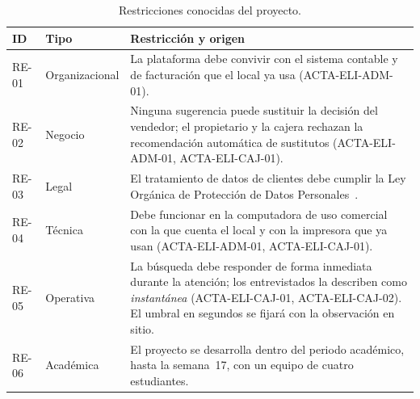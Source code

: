 \begin{table}[H]
\centering
\caption{Restricciones conocidas del proyecto.}
\label{tab:restricciones}
\small
\begin{tabularx}{\textwidth}{@{}L{1.2cm}L{2.6cm}X@{}}
\toprule
\textbf{ID} & \textbf{Tipo} & \textbf{Restricción y origen} \\
\midrule
RE-01 & Organizacional & La plataforma debe convivir con el sistema contable y de facturación que el local ya usa (ACTA-ELI-ADM-01). \\
RE-02 & Negocio & Ninguna sugerencia puede sustituir la decisión del vendedor; el propietario y la cajera rechazan la recomendación automática de sustitutos (ACTA-ELI-ADM-01, ACTA-ELI-CAJ-01). \\
RE-03 & Legal & El tratamiento de datos de clientes debe cumplir la Ley Orgánica de Protección de Datos Personales~\cite{lopdp2021}. \\
RE-04 & Técnica & Debe funcionar en la computadora de uso comercial con la que cuenta el local y con la impresora que ya usan (ACTA-ELI-ADM-01, ACTA-ELI-CAJ-01). \\
RE-05 & Operativa & La búsqueda debe responder de forma inmediata durante la atención; los entrevistados la describen como \emph{instantánea} (ACTA-ELI-CAJ-01, ACTA-ELI-CAJ-02). El umbral en segundos se fijará con la observación en sitio. \\
RE-06 & Académica & El proyecto se desarrolla dentro del periodo académico, hasta la semana~17, con un equipo de cuatro estudiantes. \\
\bottomrule
\end{tabularx}
\end{table}
